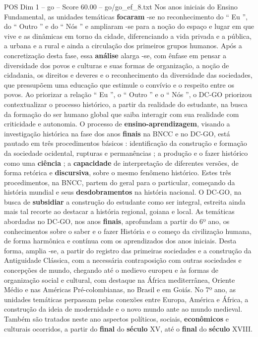 \begin{textsample}{POS Dim 1 – go – Score 60.00 – go/go\_ef\_8.txt}
Nos anos iniciais do Ensino Fundamental, as unidades temáticas \textbf{focaram} -se no reconhecimento do “ Eu ”, do “ Outro ” e do “ Nós ” e ampliaram -se para a noção do espaço e lugar em que vive e as dinâmicas em torno da cidade, diferenciando a vida privada e a pública, a urbana e a rural e ainda a circulação dos primeiros grupos humanos.
Após a concretização desta fase, essa \textbf{análise} alarga -se, com ênfase em pensar a diversidade dos povos e culturas e suas formas de organização, a noção de cidadania, os direitos e deveres e o reconhecimento da diversidade das sociedades, que pressupõem uma educação que estimule o convívio e o respeito entre os povos.
Ao priorizar a relação “ Eu ”, o “ Outro ” e o “ Nós ”, o DC-GO priorizou contextualizar o processo histórico, a partir da realidade do estudante, na busca da formação do ser humano global que saiba interagir com sua realidade com criticidade e autonomia.
O processo de \textbf{ensino-aprendizagem}, visando a investigação histórica na fase dos anos \textbf{finais} na BNCC e no DC-GO, está pautado em três procedimentos básicos : identificação da construção e formação da sociedade ocidental, rupturas e permanências ; a produção e o fazer histórico como uma \textbf{ciência} ; a \textbf{capacidade} de interpretação de diferentes versões, de forma retórica e \textbf{discursiva}, sobre o mesmo fenômeno histórico.
Estes três procedimentos, na BNCC, partem do geral para o particular, começando da história mundial e seus \textbf{desdobramentos} na história nacional.
O DC-GO, na busca de \textbf{subsidiar} a construção do estudante como ser integral, estreita ainda mais tal recorte ao destacar a história regional, goiana e local.
As temáticas abordadas no DC-GO, nos anos \textbf{finais}, aprofundam a partir do 6º ano, os conhecimentos sobre o saber e o fazer História e o começo da civilização humana, de forma harmônica e contínua com os aprendizados dos anos iniciais.
Desta forma, amplia -se, a partir do registro das primeiras sociedades e a construção da Antiguidade Clássica, com a necessária contraposição com outras sociedades e concepções de mundo, chegando até o medievo europeu e às formas de organização social e cultural, com destaque na África mediterrânea, Oriente Médio e nas Américas Pré-colombianas, no Brasil e em Goiás.
No 7º ano, as unidades temáticas perpassam pelas conexões entre Europa, América e África, a construção da ideia de modernidade e o novo mundo ante ao mundo medieval.
Também são tratados neste ano aspectos políticos, sociais, \textbf{econômicos} e culturais ocorridos, a partir do \textbf{final} do \textbf{século} XV, até o \textbf{final} do \textbf{século} XVIII.

\end{textsample}
